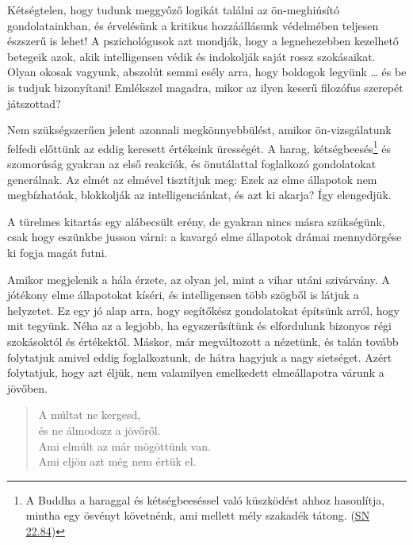 Kétségtelen, hogy tudunk meggyőző logikát találni az ön-meghiúsító
gondolatainkban, és érvelésünk a kritikus hozzáállásunk védelmében
teljesen észszerű is lehet! A pszichológusok azt mondják, hogy a
legnehezebben kezelhető betegeik azok, akik intelligensen védik és
indokolják saját rossz szokásaikat. Olyan okosak vagyunk, abszolút semmi
esély arra, hogy boldogok legyünk \ldots{} és be is tudjuk bizonyítani!
Emlékszel magadra, mikor az ilyen keserű filozófus szerepét játszottad?

Nem szükségszerűen jelent azonnali megkönnyebbülést, amikor
ön-vizsgálatunk felfedi előttünk az eddig keresett értékeink ürességét.
A harag, kétségbeesés\footnote{A Buddha a haraggal és kétségbeeséssel
  való küszködést ahhoz hasonlítja, mintha egy ösvényt követnénk, ami
  mellett mély szakadék tátong.
  (\href{https://www.accesstoinsight.org/tipitaka/sn/sn22/sn22.084.than.html}{SN
  22.84})} és szomorúság gyakran az első reakciók, és önutálattal
foglalkozó gondolatokat generálnak. Az elmét az elmével tisztítjuk meg:
Ezek az elme állapotok nem megbízhatóak, blokkolják az
intelligenciánkat, és azt ki akarja? Így elengedjük.


A türelmes kitartás egy alábecsült erény, de gyakran nincs másra
szükségünk, csak hogy eszünkbe jusson várni: a kavargó elme állapotok
drámai mennydörgése ki fogja magát futni.

Amikor megjelenik a hála érzete, az olyan jel, mint a vihar utáni
szivárvány. A jótékony elme állapotokat kíséri, és intelligensen több
szögből is látjuk a helyzetet. Ez egy jó alap arra, hogy segítőkész
gondolatokat építsünk arról, hogy mit tegyünk. Néha az a legjobb, ha
egyszerűsítünk és elfordulunk bizonyos régi szokásoktól és értékektől.
Máskor, már megváltozott a nézetünk, és talán tovább folytatjuk amivel
eddig foglalkoztunk, de hátra hagyjuk a nagy sietséget. Azért
folytatjuk, hogy azt éljük, nem valamilyen emelkedett elmeállapotra
várunk a jövőben.

\begin{quote}
A múltat ne kergesd,\\
és ne álmodozz a jövőről.\\
Ami elmúlt az már mögöttünk van.\\
Ami eljön azt még nem értük el.

\bigskip

\end{quote}

